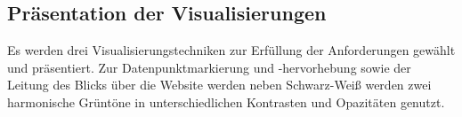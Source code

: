 \documentclass[usegeometry=true]{scrartcl}
\begin{document}



\subsection{Präsentation der Visualisierungen}
Es werden drei Visualisierungstechniken zur Erfüllung der Anforderungen gewählt und präsentiert.
Zur Datenpunktmarkierung und -hervorhebung sowie der Leitung des Blicks über die Website werden neben Schwarz-Weiß werden zwei harmonische Grüntöne in unterschiedlichen Kontrasten und Opazitäten genutzt.
\end{document}
